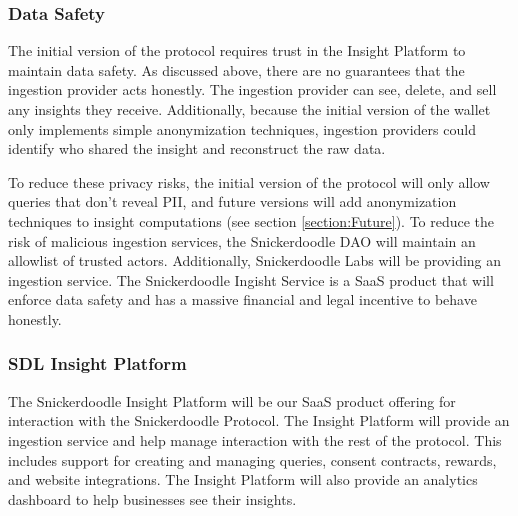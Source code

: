 \subsubsection{Data Safety}
\label{section:IngestionDataSafety}
The initial version of the protocol requires trust in the Insight Platform to maintain data safety. As discussed above, there are no guarantees that the ingestion provider acts honestly. The ingestion provider can see, delete, and sell any insights they receive. Additionally, because the initial version of the wallet only implements simple anonymization techniques, ingestion providers could identify who shared the insight and reconstruct the raw data. 


To reduce these privacy risks, the initial version of the protocol will only allow queries that don't reveal PII, and future versions will add anonymization techniques to insight computations (see section \ref{section:Future}). To reduce the risk of malicious ingestion services, the Snickerdoodle DAO will maintain an allowlist of trusted actors. Additionally, Snickerdoodle Labs will be providing an ingestion service. The Snickerdoodle Ingisht Service is a SaaS product that will enforce data safety and has a massive financial and legal incentive to behave honestly.

\subsubsection{SDL Insight Platform}
\label{section:InsightService}
The Snickerdoodle Insight Platform will be our SaaS product offering for interaction with the Snickerdoodle Protocol. The Insight Platform will provide an ingestion service and help manage interaction with the rest of the protocol. This includes support for creating and managing queries, consent contracts, rewards, and website integrations. The Insight Platform will also provide an analytics dashboard to help businesses see their insights.